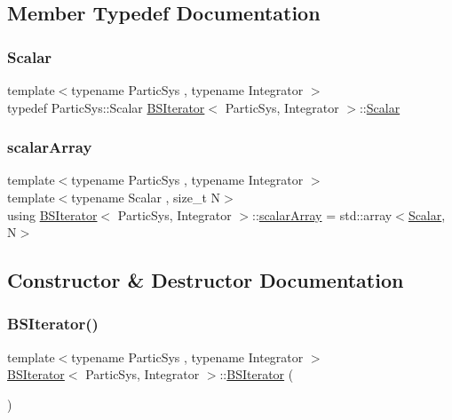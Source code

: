 \subsection{Member Typedef Documentation}
\mbox{\label{class_b_s_iterator_a7857f8ff9032955ea4dcc22cd18ca7a1}} 
\subsubsection{\texorpdfstring{Scalar}{Scalar}}
{\footnotesize\ttfamily template$<$typename Partic\+Sys , typename Integrator $>$ \\
typedef Partic\+Sys\+::\+Scalar \mbox{\hyperlink{class_b_s_iterator}{B\+S\+Iterator}}$<$ Partic\+Sys, Integrator $>$\+::\mbox{\hyperlink{class_b_s_iterator_a7857f8ff9032955ea4dcc22cd18ca7a1}{Scalar}}}

\mbox{\label{class_b_s_iterator_ab0aa7c10b56500273af05dcd85fd8389}} 
\subsubsection{\texorpdfstring{scalar\+Array}{scalarArray}}
{\footnotesize\ttfamily template$<$typename Partic\+Sys , typename Integrator $>$ \\
template$<$typename Scalar , size\+\_\+t N$>$ \\
using \mbox{\hyperlink{class_b_s_iterator}{B\+S\+Iterator}}$<$ Partic\+Sys, Integrator $>$\+::\mbox{\hyperlink{class_b_s_iterator_ab0aa7c10b56500273af05dcd85fd8389}{scalar\+Array}} =  std\+::array$<$\mbox{\hyperlink{class_b_s_iterator_a7857f8ff9032955ea4dcc22cd18ca7a1}{Scalar}}, N$>$}



\subsection{Constructor \& Destructor Documentation}
\mbox{\label{class_b_s_iterator_a144fb5c55fcd7bc873e73f4d06276fb2}} 
\subsubsection{\texorpdfstring{B\+S\+Iterator()}{BSIterator()}}
{\footnotesize\ttfamily template$<$typename Partic\+Sys , typename Integrator $>$ \\
\mbox{\hyperlink{class_b_s_iterator}{B\+S\+Iterator}}$<$ Partic\+Sys, Integrator $>$\+::\mbox{\hyperlink{class_b_s_iterator}{B\+S\+Iterator}} (\begin{DoxyParamCaption}{ }\end{DoxyParamCaption})}



